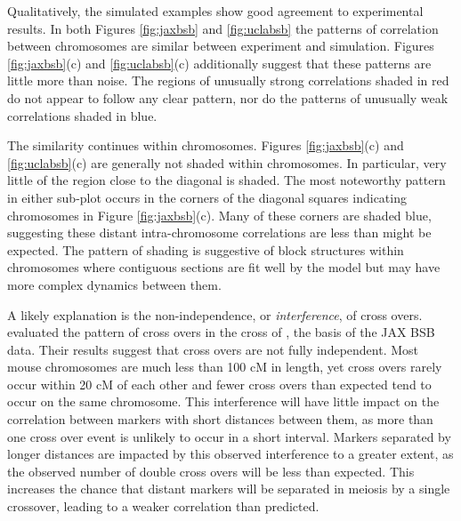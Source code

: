 \documentclass[sts]{imsart}
\begin{document}
Qualitatively, the simulated examples show good agreement to experimental results. In both Figures \ref{fig:jaxbsb} and \ref{fig:uclabsb} the patterns of correlation between chromosomes are similar between experiment and simulation. Figures \ref{fig:jaxbsb}(c) and \ref{fig:uclabsb}(c) additionally suggest that these patterns are little more than noise. The regions of unusually strong correlations shaded in red do not appear to follow any clear pattern, nor do the patterns of unusually weak correlations shaded in blue.

The similarity continues within chromosomes. Figures \ref{fig:jaxbsb}(c) and \ref{fig:uclabsb}(c) are generally not shaded within chromosomes. In particular, very little of the region close to the diagonal is shaded. The most noteworthy pattern in either sub-plot occurs in the corners of the diagonal squares indicating chromosomes in Figure \ref{fig:jaxbsb}(c). Many of these corners are shaded blue, suggesting these distant intra-chromosome correlations are less than might be expected. The pattern of shading is suggestive of block structures within chromosomes where contiguous sections are fit well by the model but may have more complex dynamics between them. 

A likely explanation is the non-independence, or \emph{interference}, of cross overs. \cite{bromanetal2002crossover} evaluated the pattern of cross overs in the cross of \cite{roweetal1994jaxbsb}, the basis of the JAX BSB data. Their results suggest that cross overs are not fully independent. Most mouse chromosomes are much less than 100 cM in length, yet cross overs rarely occur within 20 cM of each other and fewer cross overs than expected tend to occur on the same chromosome. This interference will have little impact on the correlation between markers with short distances between them, as more than one cross over event is unlikely to occur in a short interval. Markers separated by longer distances are impacted by this observed interference to a greater extent, as the observed number of double cross overs will be less than expected. This increases the chance that distant markers will be separated in meiosis by a single crossover, leading to a weaker correlation than predicted.
\end{document}
